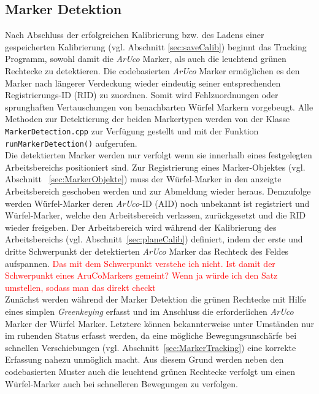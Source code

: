 \subsection{Marker Detektion}\label{sec:MarkerDetektion} 
Nach Abschluss der erfolgreichen Kalibrierung bzw. des Ladens einer gespeicherten Kalibrierung (vgl. Abschnitt \ref{sec:saveCalib}) beginnt das Tracking Programm, sowohl damit die \textit{ArUco} Marker, als auch die leuchtend grünen Rechtecke zu detektieren. Die codebasierten \textit{ArUco} Marker ermöglichen es den Marker nach längerer Verdeckung wieder eindeutig seiner entsprechenden Registrierungs-ID (RID) zu zuordnen. Somit wird Fehlzuordnungen oder sprunghaften Vertauschungen von benachbarten Würfel Markern vorgebeugt. Alle Methoden zur Detektierung der beiden Markertypen werden von der Klasse \texttt{MarkerDetection.cpp} zur Verfügung gestellt und mit der Funktion \texttt{run\-Marker\-Detection()} aufgerufen. \\
Die detektierten Marker werden nur verfolgt wenn sie innerhalb eines festgelegten Arbeitsbereichs positioniert sind. Zur Registrierung eines Marker-Objektes (vgl. Abschnitt~ \ref{sec:MarkerObjekte}) muss der Würfel-Marker in den anzeigte Arbeitsbereich geschoben werden und zur Abmeldung wieder heraus. Demzufolge werden Würfel-Marker deren \textit{ArUco}-ID (AID) noch unbekannt ist registriert und Würfel-Marker, welche den Arbeitsbereich verlassen, zurückgesetzt und die RID wieder freigeben. Der Arbeitsbereich wird während der Kalibrierung des Arbeitsbereichs (vgl. Abschnitt~\ref{sec:planeCalib}) definiert, indem der erste und dritte Schwerpunkt der detektierten \textit{ArUco} Marker das Rechteck des Feldes aufspannen. \textcolor{red}{Das mit dem Schwerpunkt verstehe ich nicht. Ist damit der Schwerpunkt eines AruCoMarkers gemeint? Wenn ja würde ich den Satz umstellen, sodass man das direkt checkt}\\
Zunächst werden während der Marker Detektion die grünen Rechtecke mit Hilfe eines simplen \textit{Greenkeying} erfasst und im Anschluss die erforderlichen \textit{ArUco} Marker der Würfel Marker. Letztere können bekannterweise unter Umständen nur im ruhenden Status erfasst werden, da eine mögliche Bewegungsunschärfe bei schnellen Verschiebungen (vgl. Abschnitt~\ref{sec:MarkerTracking}) eine korrekte Erfassung nahezu unmöglich macht. 
Aus diesem Grund werden neben den codebasierten Muster auch die leuchtend grünen Rechtecke verfolgt um einen Würfel-Marker auch bei schnelleren Bewegungen zu verfolgen.
